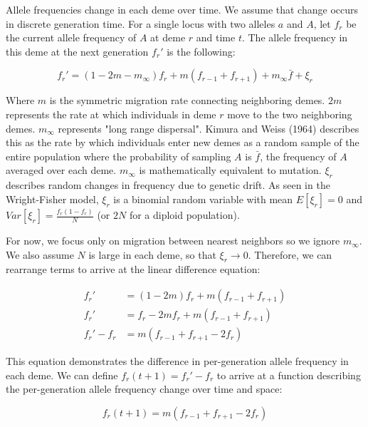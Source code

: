 Allele frequencies change in each deme over time. We assume that change occurs in discrete generation time. For a single locus with two alleles $a$ and $A$, let $f_r$ be the current allele frequency of $A$ at deme $r$ and time $t$. The allele frequency in this deme at the next generation $f_r'$ is the following:

\begin{equation}
    f_r' = (1-2m-m_\infty)f_r + m(f_{r-1} + f_{r+1}) + m_\infty \bar{f} + \xi_r
\end{equation}


Where $m$ is the symmetric migration rate connecting neighboring demes. $2m$ represents the rate at which individuals in deme $r$ move to the two neighboring demes. $m_\infty$ represents "long range dispersal". Kimura and Weiss (1964) \cite{kimura_stepping_1964} describes this as the rate by which individuals enter new demes as a random sample of the entire population where the probability of sampling $A$ is $\bar{f}$, the frequency of $A$ averaged over each deme. $m_\infty$ is mathematically equivalent to mutation. $\xi_r$ describes random changes in frequency due to genetic drift. As seen in the Wright-Fisher model, $\xi_r$ is a binomial random variable with mean $E[\xi_r]=0$ and $Var[\xi_r] = \frac{f_r(1-f_r)}{N}$ (or $2N$ for a diploid population).


For now, we focus only on migration between nearest neighbors so we ignore $m_\infty$. We also assume $N$ is large in each deme, so that $\xi_r \to 0$. Therefore, we can rearrange terms to arrive at the linear difference equation:

\begin{equation}
    \begin{split}
        f_r' &= (1-2m)f_r + m(f_{r-1} + f_{r+1}) \\ 
        f_r' &= f_r -2mf_r + m(f_{r-1} + f_{r+1}) \\
        f_r' - f_r &= m(f_{r-1} + f_{r+1} - 2f_r)
    \end{split}
\end{equation}


This equation demonstrates the difference in per-generation allele frequency in each deme. We can define $f_r(t+1) = f_r' - f_r$ to arrive at a function describing the per-generation allele frequency change over time and space:

\begin{equation}
    f_r(t+1) = m(f_{r-1} + f_{r+1} -2f_r)
\end{equation}


